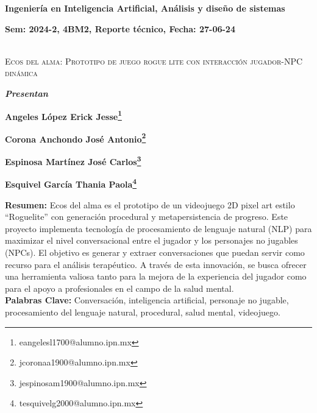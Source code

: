 \documentclass[12pt,twoside]{article}
\begin{document}
	
	\centerline{\bf Ingeniería en Inteligencia Artificial, Análisis y diseño de sistemas}
	
	\centerline{\bf Sem: 2024-2, 4BM2, Reporte técnico, Fecha: 27-06-24\\\\}
	
	\centerline{}
	
	
	
	\begin{center}
		\Large{\textsc{Ecos del alma: Prototipo de juego rogue lite con interacción jugador-NPC dinámica}} 
	\end{center}
	\centerline{}
	\centerline{\bf {\textit{Presentan}}}
	\centerline{}
	\centerline{\bf {Angeles López Erick Jesse\footnote{eangelesl1700@alumno.ipn.mx}}}
	\centerline{\bf {Corona Anchondo José Antonio\footnote{jcoronaa1900@alumno.ipn.mx}}}
	\centerline{\bf {	Espinosa Martínez José Carlos\footnote{jespinosam1900@alumno.ipn.mx}}}
	\centerline{\bf {Esquivel García Thania Paola\footnote{tesquivelg2000@alumno.ipn.mx}}}
	
	
	
	\newtheorem{Theorem}{\quad Theorem}[section]
	
	\newtheorem{Definition}[Theorem]{\quad Definition}
	
	\newtheorem{Corollary}[Theorem]{\quad Corollary}
	
	\newtheorem{Lemma}[Theorem]{\quad Lemma}
	
	\newtheorem{Example}[Theorem]{\quad Example}
	
	\bigskip
	
	\bigskip
	
	\textbf{Resumen:} Ecos del alma es el prototipo de un videojuego 2D pixel art estilo ``Roguelite'' con generación procedural y metapersistencia de progreso. Este proyecto implementa tecnología de procesamiento de lenguaje natural (NLP) para maximizar el nivel conversacional entre el jugador y los personajes no jugables (NPCs). El objetivo es generar y extraer conversaciones que puedan servir como recurso para el análisis terapéutico. A través de esta innovación, se busca ofrecer una herramienta valiosa tanto para la mejora de la experiencia del jugador como para el apoyo a profesionales en el campo de la salud mental. \\ 
	
	{\bf Palabras Clave:} Conversación, inteligencia artificial, personaje no jugable, procesamiento del lenguaje natural, procedural, salud mental, videojuego. \\
	
\end{document}
